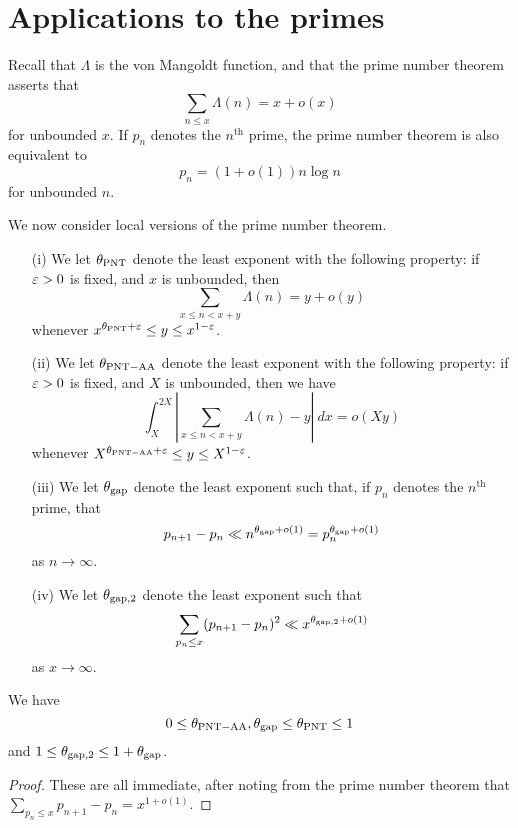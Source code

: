 \chapter{Applications to the primes}\label{primes-sec}

Recall that $\Lambda$ is the von Mangoldt function, and that the prime number theorem asserts that
$$ \sum_{n \leq x} \Lambda(n) = x + o(x)$$
for unbounded $x$.  If $p_n$ denotes the $n^{\mathrm{th}}$ prime, the prime number theorem is also equivalent to
$$ p_n = (1+o(1)) n \log n$$
for unbounded $n$.

We now consider local versions of the prime number theorem.

\begin{definition}\label{pnt-ap}
    \begin{itemize}
        \item[(i)] We let $\theta_{\mathrm{PNT}}$ denote the least exponent with the following property: if $\varepsilon > 0$ is fixed, and $x$ is unbounded, then
        $$ \sum_{x \leq n < x+y} \Lambda(n) = y + o(y)$$
        whenever $x^{\theta_{\mathrm{PNT}} + \varepsilon} \leq y \leq x^{1-\varepsilon}$.
        \item[(ii)] We let $\theta_{\mathrm{PNT-AA}}$ denote the least exponent with the following property: if $\varepsilon > 0$ is fixed, and $X$ is unbounded, then we have
        $$ \int_X^{2X} |\sum_{x \leq n < x+y} \Lambda(n)-y|\ dx = o(Xy)$$
        whenever $X^{\theta_{\mathrm{PNT-AA}} + \varepsilon} \leq y \leq X^{1-\varepsilon}$.
        \item[(iii)] We let $\theta_{\mathrm{gap}}$ denote the least exponent such that, if $p_n$ denotes the $n^{\mathrm{th}}$ prime, that
        $$ p_{n+1} - p_n \ll n^{\theta_{\mathrm{gap}}+o(1)} = p_n^{\theta_{\mathrm{gap}}+o(1)}$$
        as $n \to \infty$.
        \item[(iv)] We let $\theta_{\mathrm{gap},2}$ denote the least exponent such that
        $$ \sum_{p_n \leq x} (p_{n+1}-p_n)^2 \ll x^{\theta_{\mathrm{gap},2}+o(1)}$$
        as $x \to \infty$.
    \end{itemize}
\end{definition}

\begin{lemma}\label{pnt-triv}
    We have
    $$ 0 \leq \theta_{\mathrm{PNT-AA}}, \theta_{\mathrm{gap}} \leq \theta_{\mathrm{PNT}} \leq 1$$
    and $1 \leq \theta_{\mathrm{gap},2} \leq 1+\theta_{\mathrm{gap}}$.
\end{lemma}

\begin{proof} These are all immediate, after noting from the prime number theorem that $\sum_{p_n \leq x} p_{n+1} - p_n = x^{1+o(1)}$.
\end{proof}


